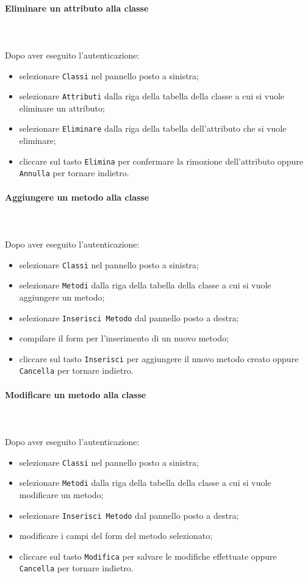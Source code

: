 	\paragraph{Eliminare un attributo alla classe} \mbox{}\\ \mbox{}\\
	Dopo aver eseguito l'autenticazione:
	\begin{itemize}
		\item selezionare \texttt{Classi} nel pannello posto a sinistra;
		\item selezionare \texttt{Attributi} dalla riga della tabella della classe
		a cui si vuole eliminare un attributo;\
		\item selezionare \texttt{Eliminare} dalla riga della tabella dell'attributo 
		che si vuole eliminare;
		\item cliccare sul tasto \texttt{Elimina} per confermare la rimozione dell'attributo
		oppure \texttt{Annulla} per tornare indietro.
	\end{itemize}
	
	\paragraph{Aggiungere un metodo alla classe} \mbox{}\\ \mbox{}\\
	Dopo aver eseguito l'autenticazione:
	\begin{itemize}
		\item selezionare \texttt{Classi} nel pannello posto a sinistra;
		\item selezionare \texttt{Metodi} dalla riga della tabella della classe
		a cui si vuole aggiungere un metodo;
		\item selezionare \texttt{Inserisci Metodo} dal pannello posto a destra;
		\item compilare il form per l'inserimento di un nuovo metodo;
		\item cliccare sul tasto \texttt{Inserisci} per aggiungere il nuovo metodo 
		creato oppure \texttt{Cancella} per tornare indietro.	
	\end{itemize}
	
	\paragraph{Modificare un metodo alla classe} \mbox{}\\ \mbox{}\\
	Dopo aver eseguito l'autenticazione:
	\begin{itemize}
		\item selezionare \texttt{Classi} nel pannello posto a sinistra;
		\item selezionare \texttt{Metodi} dalla riga della tabella della classe
		a cui si vuole modificare un metodo;
		\item selezionare \texttt{Inserisci Metodo} dal pannello posto a destra;
		\item modificare i campi del form del metodo selezionato;
		\item cliccare sul tasto \texttt{Modifica} per salvare le modifiche effettuate
		oppure \texttt{Cancella} per tornare indietro.	
	\end{itemize}
	
